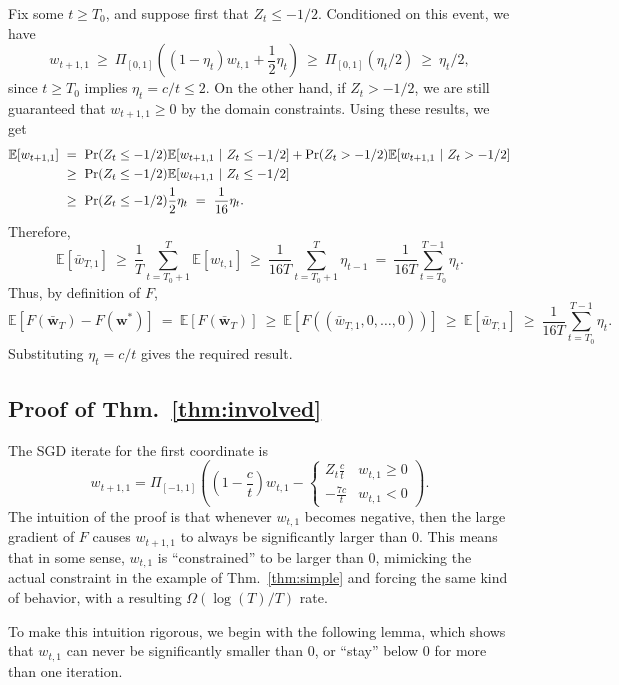 \documentclass{article}
\newcommand{\E}{\mathbb{E}}
\newcommand{\bw}{\mathbf{w}}
\newcommand{\thmref}[1]{Thm.~\ref{#1}}
\begin{document}
Fix some $t\geq T_0$, and suppose first that $Z_t\leq -1/2$. Conditioned on this event, we have
\[
w_{t+1,1}~\geq~ \Pi_{[0,1]}\left((1-\eta_t)w_{t,1}+\frac{1}{2}\eta_t\right)
~\geq~\Pi_{[0,1]}(\eta_t/2)~\geq~ \eta_t/2,
\]
since $t\geq T_0$ implies $\eta_t =c/t \leq 2$. On the other hand, if $Z_t>-1/2$, we are still guaranteed that $w_{t+1,1}\geq 0$ by the domain constraints. Using these results, we get
\begin{align}\label{eq:ewlbound}
\E[w_{t+1,1}] ~&=~ \Pr(Z_t\leq -1/2)\E[w_{t+1,1}~|~ Z_t\leq -1/2]+\Pr(Z_t> -1/2)\E[w_{t+1,1}~|~Z_t> -1/2]\notag\\
&\geq~ \Pr(Z_t\leq -1/2)\E[w_{t+1,1}~|~Z_t\leq -1/2]\notag\\
&\geq~ \Pr(Z_t\leq -1/2) \frac{1}{2}\eta_t ~=~ \frac{1}{16}\eta_t.
\end{align}
Therefore,
\[
\E[\bar{w}_{T,1}] ~\geq~ \frac{1}{T}\sum_{t=T_0+1}^{T}\E[w_{t,1}] ~\geq~ \frac{1}{16 T}\sum_{t=T_0+1}^{T}\eta_{t-1}~=~ \frac{1}{16 T}\sum_{t=T_0}^{T-1}\eta_t.
\]
Thus, by definition of $F$,
\[
\E\left[F(\bar{\bw}_{T})-F(\bw^{*})\right] ~=~ \E\left[F(\bar{\bw}_{T})\right] ~\geq~ \E\left[F((\bar{w}_{T,1},0,\ldots,0))\right] ~\geq~
\E\left[\bar{w}_{T,1}\right] ~\geq~ \frac{1}{16T}\sum_{t=T_0}^{T-1}\eta_t.
\]
Substituting $\eta_t = c/t$ gives the required result.



\subsection{Proof of \thmref{thm:involved}}\label{app:involved}

The SGD iterate for the first coordinate is
\begin{equation}\label{eq:iterate2}
w_{t+1,1} = \Pi_{[-1,1]}\left(\left(1-\frac{c}{t}\right)w_{t,1}-\begin{cases}Z_t \frac{c}{t} & w_{t,1}\geq 0\\ -\frac{7c}{t} & w_{t,1} < 0 \end{cases}\right).
\end{equation}
The intuition of the proof is that whenever $w_{t,1}$ becomes negative, then the large gradient of $F$ causes $w_{t+1,1}$ to always be significantly larger than $0$. This means that in some sense, $w_{t,1}$ is ``constrained'' to be larger than $0$, mimicking the actual constraint in the example of \thmref{thm:simple} and forcing the same kind of behavior, with a resulting $\Omega(\log(T)/T)$ rate.

To make this intuition rigorous, we begin with the following lemma, which shows that $w_{t,1}$ can never be significantly smaller than $0$, or ``stay'' below $0$ for more than one iteration.
\end{document}

